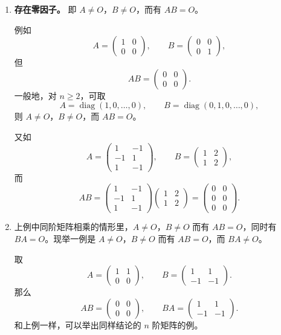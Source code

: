 \begin{enumerate}
\item \textbf{存在零因子。} 即 $A\ne O$，$B\ne O$，而有 $AB=O$。

例如
\[
 A=\begin{pmatrix}1&0\\0&0\end{pmatrix},\qquad
 B=\begin{pmatrix}0&0\\0&1\end{pmatrix},
\]
但
\[
 AB=\begin{pmatrix}0&0\\0&0\end{pmatrix}.
\]
一般地，对 $n\ge2$，可取
\[
 A=\operatorname{diag}(1,0,\ldots,0),\qquad
 B=\operatorname{diag}(0,1,0,\ldots,0),
\]
则 $A\ne O$，$B\ne O$，而 $AB=O$。

又如
\[
 A=\begin{pmatrix}1&-1\\-1&1\\1&-1\end{pmatrix},\qquad
 B=\begin{pmatrix}1&2\\1&2\end{pmatrix},
\]
而
\[
 AB=
 \begin{pmatrix}1&-1\\-1&1\\1&-1\end{pmatrix}
 \begin{pmatrix}1&2\\1&2\end{pmatrix}
 =\begin{pmatrix}0&0\\0&0\\0&0\end{pmatrix}.
\]

\item 上例中同阶矩阵相乘的情形里，$A\ne O$，$B\ne O$ 而有 $AB=O$，同时有 $BA=O$。现举一例是 $A\ne O$，$B\ne O$ 而有 $AB=O$，而 $BA\ne O$。

取
\[
 A=\begin{pmatrix}1&1\\0&0\end{pmatrix},\qquad
 B=\begin{pmatrix}1&1\\-1&-1\end{pmatrix}.
\]
那么
\[
 AB=\begin{pmatrix}0&0\\0&0\end{pmatrix},
\qquad
 BA=\begin{pmatrix}1&1\\-1&-1\end{pmatrix}.
\]
和上例一样，可以举出同样结论的 $n$ 阶矩阵的例。


\end{enumerate}
